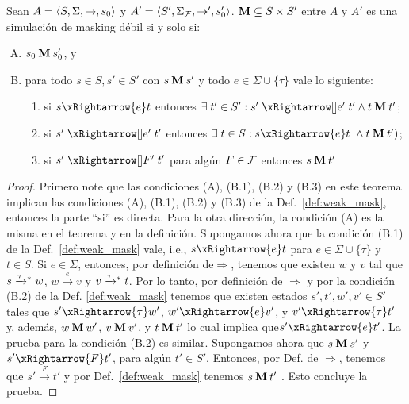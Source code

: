 \begin{thm} \label{thm:weak_thm}
  Sean
$A =\langle S, \Sigma, \rightarrow, s_0 \rangle$ y $A' =\langle S', \Sigma_{\mathcal{F}}, \rightarrow', s'_0 \rangle$. 
$\mathbin{\mathbf{M}} \subseteq S \times S'$ entre $A$ y $A'$ es una simulación de masking débil si y solo si:

\begin{enumerate}[(A)]
  \item $s_0 \mathbin{\mathbf{M}} s'_0$, y
  \item para todo $s \in S, s' \in S'$ con $s \mathbin{\mathbf{M}} s'$ y todo $e \in \Sigma \cup \{\tau\}$ vale lo siguiente:

  \begin{enumerate}[(1)]
    \item si $s \xRightarrow{e} t$ entonces $\exists\; t' \in S': s' \xRightarrowprime{\text{e}} t' 
    \wedge t \M t'$;

      \item si $s' \xRightarrowprime{e} t'$ entonces 
      $\exists \; t \in S: s \xRightarrow{e} t \
      \wedge t \M t')$;

      \item si $s' \xRightarrowprime{F} t'$ para algún $F \in \mathcal{F}$ entonces 
      $s \mathbin{\mathbf{M}} t'$
  \end{enumerate}
\end{enumerate}

\end{thm}

\noindent
\begin{proof}
	Primero note que las condiciones (A), (B.1), (B.2) y (B.3) en este teorema implican las condiciones (A), (B.1), (B.2) y (B.3)
 de la Def.~\ref{def:weak_mask}, entonces la parte ``si'' es directa. Para la otra dirección, la condición (A) es la misma en el teorema y en la definición.
 Supongamos ahora que la condición (B.1) de la Def.~\ref{def:weak_mask} vale, i.e.,
 $s \xRightarrow{e} t$ para $e \in \Sigma \cup \{\tau\}$ y $t \in S$. 
Si $e \in \Sigma$, entonces, por definición de$\Rightarrow$, tenemos que existen $w$ y $v$ tal que $s \mathrel{{\xrightarrow[]{\tau}}{}^*} w$, $w \xrightarrow{e} v$
 y $v \mathrel{{\xrightarrow[]{\tau}}{}^*} t$. Por lo tanto, por definición de $\Rightarrow$ y por la condición (B.2) de la Def. \ref{def:weak_mask} 
 tenemos que existen estados $s',t',w',v' \in S'$
 tales que $s' \xRightarrow{\tau} w'$, $w' \xRightarrow{e} v'$, y $v' \xRightarrow{\tau} t'$ y, 
 además, $w \mathbin{\mathbf{M}} w'$, $v \mathbin{\mathbf{M}} v'$, y $t \mathbin{\mathbf{M}} t'$ lo cual implica que$s' \xRightarrow{e} t'$. 
 La prueba para la condición (B.2) es similar.
 	Supongamos ahora que $s \mathbin{\mathbf{M}} s'$ y $s' \xRightarrow{F} t'$, para algún $t' \in S'$. Entonces, por Def. de 
$\Rightarrow$, tenemos que $s' \xrightarrow{F} t'$ y por Def.~\ref{def:weak_mask}
 tenemos $s \mathbin{\mathbf{M}} t'$ . Esto concluye la prueba.
 \qedhere 
 \end{proof} 
 
